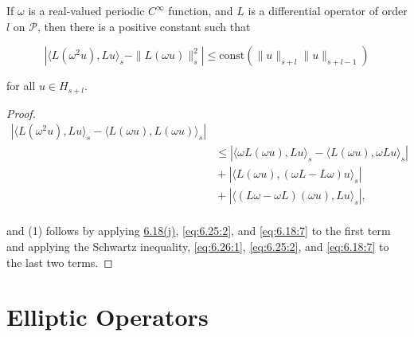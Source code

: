\begin{lemma}\label{thm:6.27}
If $\omega$ is a real-valued periodic $C^{\infty}$ function, and $L$ is a differential operator of order $l$ on $\mathcal{P}$, then there is a positive constant such that

\begin{equation}
\tag{1}\label{eq:6.27:1}
|\langle L(\omega^{2}u),L u\rangle_{s}-\|L(\omega u)\|_{s}^{2}|\leq\mathrm{const}\left(\|u\|_{s+l}\|u\|_{s+l-1}\right)
\end{equation}

for all  $ u \in H_{s+l} $.
\end{lemma}

\begin{proof}
\[
\begin{aligned}{|\langle L(\omega^{2}u),L u\rangle_{s}-\langle L(\omega u),L(\omega u)\rangle_{s}|}&{{}}\\ {}&{{}\leq|\langle\omega L(\omega u),L u\rangle_{s}-\langle L(\omega u),\omega L u\rangle_{s}|}\\ {}&{{}+|\langle L(\omega u),(\omega L-L\omega)u\rangle_{s}|}\\ {}&{{}+|\langle(L\omega-\omega L)(\omega u),L u\rangle_{s}|,}\\ \end{aligned}
\]

and (1) follows by applying \hyperref[thm:6.18]{6.18(j)}, \eqref{eq:6.25:2}, and \eqref{eq:6.18:7} to the first term and applying the Schwartz inequality, \eqref{eq:6.26:1}, \eqref{eq:6.25:2}, and \eqref{eq:6.18:7} to the last two terms.
\end{proof}

\section{Elliptic Operators}


